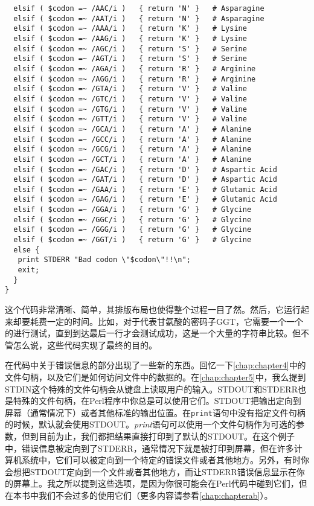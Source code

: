\begin{lstlisting}
  elsif ( $codon =~ /AAC/i )   { return 'N' }   # Asparagine
  elsif ( $codon =~ /AAT/i )   { return 'N' }   # Asparagine
  elsif ( $codon =~ /AAA/i )   { return 'K' }   # Lysine
  elsif ( $codon =~ /AAG/i )   { return 'K' }   # Lysine
  elsif ( $codon =~ /AGC/i )   { return 'S' }   # Serine
  elsif ( $codon =~ /AGT/i )   { return 'S' }   # Serine
  elsif ( $codon =~ /AGA/i )   { return 'R' }   # Arginine
  elsif ( $codon =~ /AGG/i )   { return 'R' }   # Arginine
  elsif ( $codon =~ /GTA/i )   { return 'V' }   # Valine
  elsif ( $codon =~ /GTC/i )   { return 'V' }   # Valine
  elsif ( $codon =~ /GTG/i )   { return 'V' }   # Valine
  elsif ( $codon =~ /GTT/i )   { return 'V' }   # Valine
  elsif ( $codon =~ /GCA/i )   { return 'A' }   # Alanine
  elsif ( $codon =~ /GCC/i )   { return 'A' }   # Alanine
  elsif ( $codon =~ /GCG/i )   { return 'A' }   # Alanine
  elsif ( $codon =~ /GCT/i )   { return 'A' }   # Alanine
  elsif ( $codon =~ /GAC/i )   { return 'D' }   # Aspartic Acid
  elsif ( $codon =~ /GAT/i )   { return 'D' }   # Aspartic Acid
  elsif ( $codon =~ /GAA/i )   { return 'E' }   # Glutamic Acid
  elsif ( $codon =~ /GAG/i )   { return 'E' }   # Glutamic Acid
  elsif ( $codon =~ /GGA/i )   { return 'G' }   # Glycine
  elsif ( $codon =~ /GGC/i )   { return 'G' }   # Glycine
  elsif ( $codon =~ /GGG/i )   { return 'G' }   # Glycine
  elsif ( $codon =~ /GGT/i )   { return 'G' }   # Glycine
  else {
   print STDERR "Bad codon \"$codon\"!!\n";
   exit;
  }
}
\end{lstlisting}

这个代码非常清晰、简单，其排版布局也使得整个过程一目了然。然后，它运行起来却要耗费一定的时间。比如，对于代表甘氨酸的密码子GGT，它需要一个一个的进行测试，直到到达最后一行才会测试成功，这是一个大量的字符串比较。但不管怎么说，这些代码实现了最终的目的。

在代码中关于错误信息的部分出现了一些新的东西。回忆一下\autoref{chap:chapter4}中的文件句柄，以及它们是如何访问文件中的数据的。在\autoref{chap:chapter5}中，我么提到STDIN这个特殊的文件句柄会从键盘上读取用户的输入。STDOUT和STDERR也是特殊的文件句柄，在Perl程序中你总是可以使用它们。STDOUT把输出定向到屏幕（通常情况下）或者其他标准的输出位置。在\verb|print|语句中没有指定文件句柄的时候，默认就会使用STDOUT。\textit{print}语句可以使用一个文件句柄作为可选的参数，但到目前为止，我们都把结果直接打印到了默认的STDOUT。在这个例子中，错误信息被定向到了STDERR，通常情况下就是被打印到屏幕，但在许多计算机系统中，它们可以被定向到一个特定的错误文件或者其他地方。另外，有时你会想把STDOUT定向到一个文件或者其他地方，而让STDERR错误信息显示在你的屏幕上。我之所以提到这些选项，是因为你很可能会在Perl代码中碰到它们，但在本书中我们不会过多的使用它们（更多内容请参看\autoref{chap:chapterab}）。

